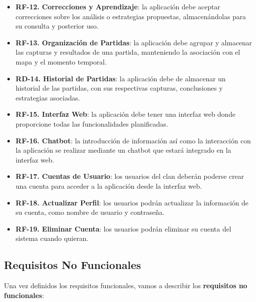 \begin{itemize}
	\item \textbf{RF-12. Correcciones y Aprendizaje}: la aplicación debe aceptar correcciones sobre los análisis o estrategias propuestas, almacenándolas para su consulta y posterior uso.
	\item \textbf{RF-13. Organización de Partidas}: la aplicación debe agrupar y almacenar las capturas y resultados de una partida, manteniendo la asociación con el mapa y el momento temporal.
	\item \textbf{RD-14. Historial de Partidas}: la aplicación debe de almacenar un historial de las partidas, con sus respectivas capturas, conclusiones y estrategias asociadas.
	\item \textbf{RF-15. Interfaz Web}: la aplicación debe tener una interfaz web donde proporcione todas las funcionalidades planificadas.
	\item \textbf{RF-16. Chatbot}: la introducción de información así como la interacción con la aplicación se realizar mediante un chatbot que estará integrado en la interfaz web.
	\item \textbf{RF-17. Cuentas de Usuario}: los usuarios del clan deberán poderse crear una cuenta para acceder a la aplicación desde la interfaz web.
	\item \textbf{RF-18. Actualizar Perfil}: los usuarios podrán actualizar la información de su cuenta, como nombre de usuario y contraseña.
	\item \textbf{RF-19. Eliminar Cuenta}: los usuarios podrán eliminar su cuenta del sistema cuando quieran.
\end{itemize}

\subsection{Requisitos No Funcionales}
Una vez definidos los requisitos funcionales, vamos a describir los \textbf{requisitos no funcionales}:


